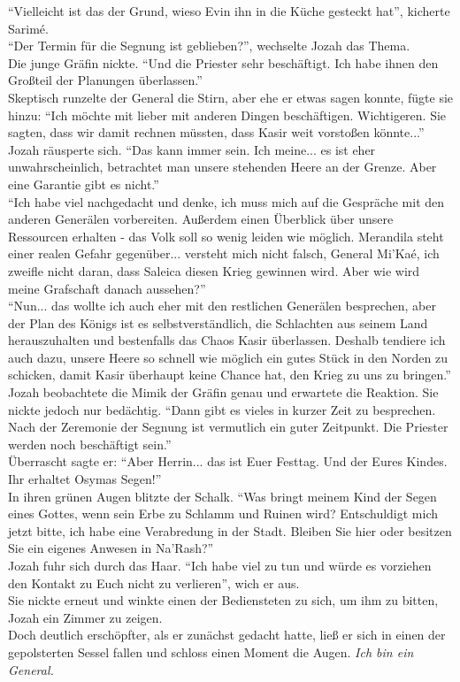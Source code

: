``Vielleicht ist das der Grund, wieso Evin ihn in die Küche gesteckt hat'', kicherte Sarimé.\\
``Der Termin für die Segnung ist geblieben?'', wechselte Jozah das Thema.\\
Die junge Gräfin nickte. ``Und die Priester sehr beschäftigt. Ich habe ihnen den Großteil der 
Planungen überlassen.''\\
Skeptisch runzelte der General die Stirn, aber ehe er etwas sagen konnte, fügte sie hinzu: ``Ich 
möchte mit lieber mit anderen Dingen beschäftigen. Wichtigeren. Sie sagten, dass wir damit rechnen 
müssten, dass Kasir weit vorstoßen könnte...''\\
Jozah räusperte sich. ``Das kann immer sein. Ich meine... es ist eher unwahrscheinlich, betrachtet 
man unsere stehenden Heere an der Grenze. Aber eine Garantie gibt es nicht.''\\
``Ich habe viel nachgedacht und denke, ich muss mich auf die Gespräche mit den anderen Generälen 
vorbereiten. Außerdem einen Überblick über unsere Ressourcen erhalten - das Volk soll so wenig 
leiden wie möglich. Merandila steht einer realen Gefahr gegenüber... versteht mich nicht falsch, 
General Mi'Kaé, ich zweifle nicht daran, dass Saleica diesen Krieg gewinnen wird. Aber wie wird 
meine Grafschaft danach aussehen?''\\
``Nun... das wollte ich auch eher mit den restlichen Generälen besprechen, aber der Plan des Königs 
ist es selbstverständlich, die Schlachten aus seinem Land herauszuhalten und bestenfalls das Chaos 
Kasir überlassen. Deshalb tendiere ich auch dazu, unsere Heere so schnell wie möglich ein gutes 
Stück in den Norden zu schicken, damit Kasir überhaupt keine Chance hat, den Krieg zu uns zu 
bringen.''\\
Jozah beobachtete die Mimik der Gräfin genau und erwartete die Reaktion. Sie nickte jedoch nur 
bedächtig. ``Dann gibt es vieles in kurzer Zeit zu besprechen. Nach der Zeremonie der Segnung ist 
vermutlich ein guter Zeitpunkt. Die Priester werden noch beschäftigt sein.''\\
Überrascht sagte er: ``Aber Herrin... das ist Euer Festtag. Und der Eures Kindes. Ihr erhaltet 
Osymas Segen!''\\
In ihren grünen Augen blitzte der Schalk. ``Was bringt meinem Kind der Segen eines Gottes, wenn 
sein Erbe zu Schlamm und Ruinen wird? Entschuldigt mich jetzt bitte, ich habe eine Verabredung in 
der Stadt. Bleiben Sie hier oder besitzen Sie ein eigenes Anwesen in Na'Rash?''\\
Jozah fuhr sich durch das Haar. ``Ich habe viel zu tun und würde es vorziehen den Kontakt zu Euch 
nicht zu verlieren'', wich er aus.\\
Sie nickte erneut und winkte einen der Bediensteten zu sich, um ihm zu bitten, Jozah ein Zimmer zu 
zeigen.\\
Doch deutlich erschöpfter, als er zunächst gedacht hatte, ließ er sich in einen der gepolsterten 
Sessel fallen und schloss einen Moment die Augen. \textit{Ich bin ein General.}\\

